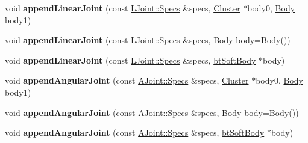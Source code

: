 \begin{DoxyCompactItemize}
\item 
\hypertarget{classbt_soft_body_a265bfcce61012a940a03adf1dc412d1f}{void {\bfseries append\+Linear\+Joint} (const \hyperlink{structbt_soft_body_1_1_l_joint_1_1_specs}{L\+Joint\+::\+Specs} \&specs, \hyperlink{structbt_soft_body_1_1_cluster}{Cluster} $\ast$body0, \hyperlink{structbt_soft_body_1_1_body}{Body} body1)}\label{classbt_soft_body_a265bfcce61012a940a03adf1dc412d1f}

\item 
\hypertarget{classbt_soft_body_a6f60720a468c4734aef16440c794c9cc}{void {\bfseries append\+Linear\+Joint} (const \hyperlink{structbt_soft_body_1_1_l_joint_1_1_specs}{L\+Joint\+::\+Specs} \&specs, \hyperlink{structbt_soft_body_1_1_body}{Body} body=\hyperlink{structbt_soft_body_1_1_body}{Body}())}\label{classbt_soft_body_a6f60720a468c4734aef16440c794c9cc}

\item 
\hypertarget{classbt_soft_body_a573a55a32496e60563cd5d9f6a41edc0}{void {\bfseries append\+Linear\+Joint} (const \hyperlink{structbt_soft_body_1_1_l_joint_1_1_specs}{L\+Joint\+::\+Specs} \&specs, \hyperlink{classbt_soft_body}{bt\+Soft\+Body} $\ast$body)}\label{classbt_soft_body_a573a55a32496e60563cd5d9f6a41edc0}

\item 
\hypertarget{classbt_soft_body_a76633cd436f4de0204f1d1e483c0a2e3}{void {\bfseries append\+Angular\+Joint} (const \hyperlink{structbt_soft_body_1_1_a_joint_1_1_specs}{A\+Joint\+::\+Specs} \&specs, \hyperlink{structbt_soft_body_1_1_cluster}{Cluster} $\ast$body0, \hyperlink{structbt_soft_body_1_1_body}{Body} body1)}\label{classbt_soft_body_a76633cd436f4de0204f1d1e483c0a2e3}

\item 
\hypertarget{classbt_soft_body_afbacb266e17f8b785985cb3f85be7f51}{void {\bfseries append\+Angular\+Joint} (const \hyperlink{structbt_soft_body_1_1_a_joint_1_1_specs}{A\+Joint\+::\+Specs} \&specs, \hyperlink{structbt_soft_body_1_1_body}{Body} body=\hyperlink{structbt_soft_body_1_1_body}{Body}())}\label{classbt_soft_body_afbacb266e17f8b785985cb3f85be7f51}

\item 
\hypertarget{classbt_soft_body_ae39c309cd794ce277964808a5d20d1d9}{void {\bfseries append\+Angular\+Joint} (const \hyperlink{structbt_soft_body_1_1_a_joint_1_1_specs}{A\+Joint\+::\+Specs} \&specs, \hyperlink{classbt_soft_body}{bt\+Soft\+Body} $\ast$body)}\label{classbt_soft_body_ae39c309cd794ce277964808a5d20d1d9}


\end{DoxyCompactItemize}
